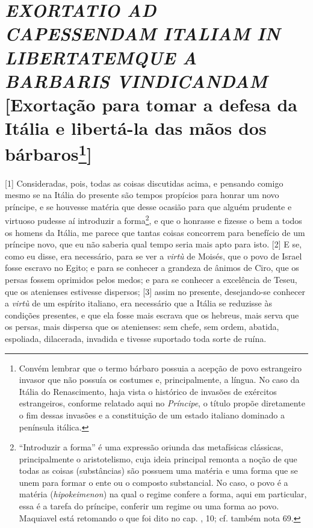 \quebra\section{\emph{EXORTATIO AD CAPESSENDAM ITALIAM IN LIBERTATEMQUE A BARBARIS VINDICANDAM}
{[}Exortação para tomar a defesa da Itália e libertá-la das mãos dos
bárbaros\protect\footnote{Convém lembrar que o termo bárbaro possuia a acepção
  de povo estrangeiro invasor que não possuía os costumes e,
  principalmente, a língua. No caso da Itália do Renascimento, haja
  vista o histórico de invasões de exércitos estrangeiros, conforme
  relatado aqui no \emph{Príncipe}, o título propõe diretamente o fim
  dessas invasões e a constituição de um estado italiano dominado a
  península itálica.}{]}}

{[}1{]} Consideradas, pois, todas as coisas discutidas acima, e pensando
comigo mesmo se na Itália do presente são tempos propícios para honrar
um novo príncipe, e se houvesse matéria que desse ocasião para que
alguém prudente e virtuoso pudesse aí introduzir a forma\footnote{``Introduzir
  a forma'' é uma expressão oriunda das metafísicas clássicas,
  principalmente o aristotelismo, cuja ideia principal remonta a noção
  de que todas as coisas (substâncias) são possuem uma matéria e uma
  forma que se unem para formar o ente ou o composto substancial. No
  caso, o povo é a matéria (\emph{hipokeimenon}) na qual o regime
  confere a forma, aqui em particular, essa é a tarefa do príncipe,
  conferir um regime ou uma forma ao povo. Maquiavel está retomando o
  que foi dito no cap. , 10; cf. também nota 69.}, e que o honrasse e
fizesse o bem a todos os homens da Itália, me parece que tantas coisas
concorrem para benefício de um príncipe novo, que eu não saberia qual
tempo seria mais apto para isto. {[}2{]} E se, como eu disse, era
necessário, para se ver a \emph{virtù} de Moisés, que o povo de Israel
fosse escravo no Egito; e para se conhecer a grandeza de ânimos de Ciro,
que os persas fossem oprimidos pelos medos; e para se conhecer a
excelência de Teseu, que os atenienses estivesse dispersos; {[}3{]}
assim no presente, desejando-se conhecer a \emph{virtù} de um espírito
italiano, era necessário que a Itália se reduzisse às condições
presentes, e que ela fosse mais escrava que os hebreus, mais serva que
os persas, mais dispersa que os atenienses: sem chefe, sem ordem,
abatida, espoliada, dilacerada, invadida e tivesse suportado toda sorte
de ruína.

